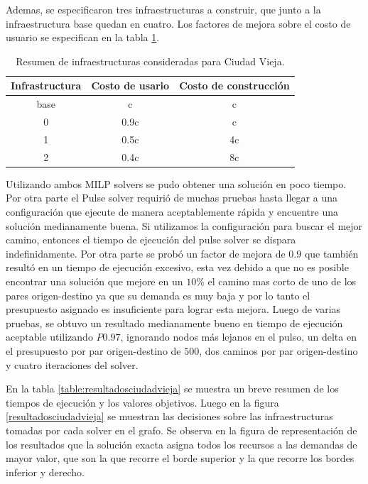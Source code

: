\documentclass{article}
\begin{document}
  Ademas, se especificaron tres infraestructuras a construir, que junto a la infraestructura base quedan en cuatro. Los factores de mejora sobre el costo de usuario se especifican en la tabla \ref{table:infrasciudadvieja}.

  \begin{table}[h!]
    \centering
    \begin{tabular}{ccc}
      \toprule
      Infrastructura & Costo de usario & Costo de construcción \\
      \midrule
      base & c & c \\
      0 & 0.9c & c \\
      1 & 0.5c & 4c \\
      2 & 0.4c & 8c \\
      \bottomrule
    \end{tabular}
    \caption{Resumen de infraestructuras consideradas para Ciudad Vieja.}\label{table:infrasciudadvieja}
  \end{table}

  Utilizando ambos MILP solvers se pudo obtener una solución en poco tiempo. Por otra parte el Pulse solver requirió de muchas pruebas hasta llegar a una configuración que ejecute de manera aceptablemente rápida y encuentre una solución medianamente buena. Si utilizamos la configuración para buscar el mejor camino, entonces el tiempo de ejecución del pulse solver se dispara indefinidamente. Por otra parte se probó un factor de mejora de $0.9$ que también resultó en un tiempo de ejecución excesivo, esta vez debido a que no es posible encontrar una solución que mejore en un $10\%$ el camino mas corto de uno de los pares origen-destino ya que su demanda es muy baja y por lo tanto el presupuesto asignado es insuficiente para lograr esta mejora. Luego de varias pruebas, se obtuvo un resultado medianamente bueno en tiempo de ejecución aceptable utilizando $P0.97$, ignorando nodos más lejanos en el pulso, un delta en el presupuesto por par origen-destino de $500$, dos caminos por par origen-destino y cuatro iteraciones del solver.
  
  En la tabla \ref{table:resultadosciudadvieja} se muestra un breve resumen de los tiempos de ejecución y los valores objetivos. Luego en la figura \ref{resultadosciudadvieja} se muestran las decisiones sobre las infraestructuras tomadas por cada solver en el grafo. Se observa en la figura de representación de los resultados que la solución exacta asigna todos los recursos a las demandas de mayor valor, que son la que recorre el borde superior y la que recorre los bordes inferior y derecho.
\end{document}
